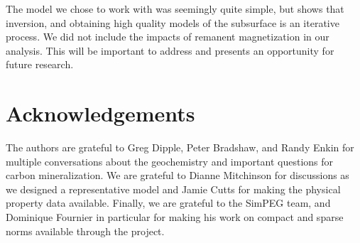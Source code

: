 \documentclass[
    paper,
  ]{geophysics}
\begin{document}
The model we chose to work with was seemingly quite simple, but shows that inversion, and obtaining high quality models of the subsurface is an iterative process. We did not include the impacts of remanent magnetization in our analysis. This will be important to address and presents an opportunity for future research.




\section{Acknowledgements}
The authors are grateful to Greg Dipple, Peter Bradshaw, and Randy Enkin for multiple conversations about the geochemistry and important questions for carbon mineralization. We are grateful to Dianne Mitchinson for discussions as we designed a representative model and Jamie Cutts for making the physical property data available. Finally, we are grateful to the SimPEG team, and Dominique Fournier in particular for making his work on compact and sparse norms available through the project.

\clearpage


\end{document}
